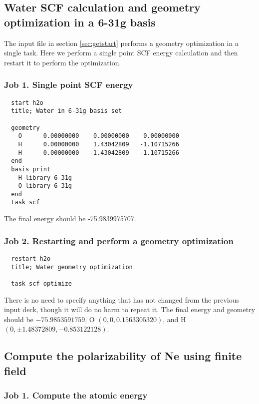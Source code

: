 \label{sec:sample}
\subsection{Water SCF calculation and geometry optimization in a 6-31g basis}
\label{sec:sample1}

The input file in section \ref{sec:getstart} performs a geometry optimization
in a single task.  Here we perform a single point SCF energy calculation and then
restart it to perform the optimization.

\subsubsection{Job 1.  Single point SCF energy}

\begin{verbatim}
  start h2o
  title; Water in 6-31g basis set

  geometry
    O      0.00000000    0.00000000    0.00000000
    H      0.00000000    1.43042809   -1.10715266
    H      0.00000000   -1.43042809   -1.10715266
  end
  basis print
    H library 6-31g
    O library 6-31g
  end
  task scf
\end{verbatim}

The final energy should be -75.9839975707.

\subsubsection{Job 2. Restarting and perform a geometry optimization}

\begin{verbatim}
  restart h2o
  title; Water geometry optimization

  task scf optimize
\end{verbatim}

There is no need to specify anything that has not changed from the
previous input deck, though it will do no harm to repeat it.  The
final energy and geometry should be $-75.9853591759$, O
$(0,0,0.1563305320)$, and H $(0, \pm1.48372809, -0.853122128)$.

\subsection{Compute the polarizability of Ne using finite field}
\label{sec:sample2}

\subsubsection{Job 1. Compute the atomic energy}

